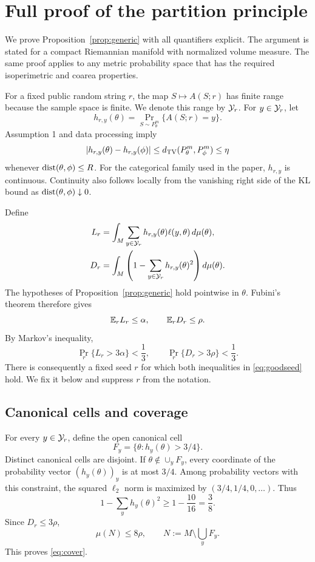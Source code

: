 \section{Full proof of the partition principle}
\label{app:generic}

We prove Proposition~\ref{prop:generic} with all quantifiers explicit.
The argument is stated for a compact Riemannian manifold with normalized volume measure.
The same proof applies to any metric probability space that has the required isoperimetric and coarea properties.

For a fixed public random string $r$, the map $S\mapsto A(S;r)$ has finite range because the sample space is finite.
We denote this range by $\mathcal Y_r$.
For $y\in\mathcal Y_r$, let
\[
 h_{r,y}(\theta)=\Pr_{S\sim P_\theta^m}\{A(S;r)=y\}.
\]
Assumption 1 and data processing imply
\begin{equation}
 |h_{r,y}(\theta)-h_{r,y}(\phi)|
 \le d_{\mathrm{TV}}(P_\theta^m,P_\phi^m)
 \le\eta
 \label{eq:app-event}
\end{equation}
whenever $\operatorname{dist}(\theta,\phi)\le R$.
For the categorical family used in the paper, $h_{r,y}$ is continuous.
Continuity also follows locally from the vanishing right side of the KL bound as $\operatorname{dist}(\theta,\phi)\downarrow0$.

Define
\begin{align*}
 L_r&=\int_M\sum_{y\in\mathcal Y_r}h_{r,y}(\theta)
               \ell(y,\theta)\,d\mu(\theta),\\
 D_r&=\int_M\left(1-\sum_{y\in\mathcal Y_r}h_{r,y}(\theta)^2\right)d\mu(\theta).
\end{align*}
The hypotheses of Proposition~\ref{prop:generic} hold pointwise in $\theta$.
Fubini's theorem therefore gives
\[
 \mathbb E_rL_r\le\alpha,
 \qquad
 \mathbb E_rD_r\le\rho.
\]
By Markov's inequality,
\[
 \Pr_r\{L_r>3\alpha\}<\frac13,
 \qquad
 \Pr_r\{D_r>3\rho\}<\frac13.
\]
There is consequently a fixed seed $r$ for which both inequalities in \eqref{eq:goodseed} hold.
We fix it below and suppress $r$ from the notation.

\subsection{Canonical cells and coverage}

For every $y\in\mathcal Y_r$, define the open canonical cell
\[
 F_y=\{\theta:h_y(\theta)>3/4\}.
\]
Distinct canonical cells are disjoint.
If $\theta\notin\cup_yF_y$, every coordinate of the probability vector $(h_y(\theta))_y$ is at most $3/4$.
Among probability vectors with this constraint, the squared $\ell_2$ norm is maximized by $(3/4,1/4,0,\ldots)$.
Thus
\[
 1-\sum_yh_y(\theta)^2\ge 1-\frac{10}{16}=\frac38.
\]
Since $D_r\le3\rho$,
\begin{equation}
 \mu(N)\le8\rho,
 \qquad
 N:=M\setminus\bigcup_yF_y.
 \label{eq:noncan-volume}
\end{equation}
This proves \eqref{eq:cover}.


